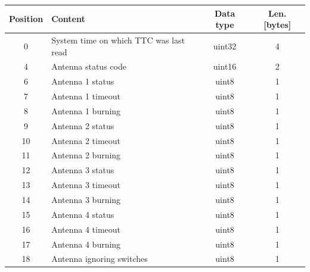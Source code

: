 \begin{table}[!ht]
	\centering
    \small
	\begin{tabular}{clcc}
		\toprule[1.5pt]
		\textbf{Position}   & \textbf{Content}                          & \textbf{Data type} & \textbf{Len. [bytes]} \\
		\midrule                                                                                                         
        0                   & System time on which TTC was last read    & uint32             & 4                     \\
		4                   & Antenna status code                       & uint16             & 2                     \\
		6                   & Antenna 1 status                          & uint8              & 1                     \\
		7                   & Antenna 1 timeout                         & uint8              & 1                     \\
		8                   & Antenna 1 burning                         & uint8              & 1                     \\
		9                   & Antenna 2 status                          & uint8              & 1                     \\
		10                  & Antenna 2 timeout                         & uint8              & 1                     \\
		11                  & Antenna 2 burning                         & uint8              & 1                     \\
		12                  & Antenna 3 status                          & uint8              & 1                     \\
		13                  & Antenna 3 timeout                         & uint8              & 1                     \\
		14                  & Antenna 3 burning                         & uint8              & 1                     \\
		15                  & Antenna 4 status                          & uint8              & 1                     \\
		16                  & Antenna 4 timeout                         & uint8              & 1                     \\
		17                  & Antenna 4 burning                         & uint8              & 1                     \\
		18                  & Antenna ignoring switches                 & uint8              & 1                     \\

\end{tabular}
\end{table}
